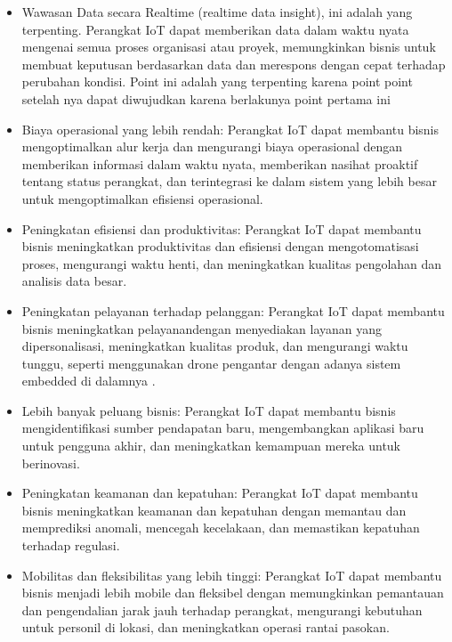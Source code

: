 \documentclass{article}
\begin{document}
\begin{itemize}
    \item Wawasan Data secara Realtime (realtime data insight), ini adalah yang terpenting. Perangkat IoT dapat memberikan data dalam waktu nyata mengenai semua proses organisasi atau proyek, memungkinkan bisnis untuk membuat keputusan berdasarkan data dan merespons dengan cepat terhadap perubahan kondisi. Point ini adalah yang terpenting karena point point setelah nya dapat diwujudkan karena berlakunya point pertama ini
    \item  Biaya operasional yang lebih rendah: Perangkat IoT dapat membantu bisnis mengoptimalkan alur kerja dan mengurangi biaya operasional dengan memberikan informasi dalam waktu nyata, memberikan nasihat proaktif tentang status perangkat, dan terintegrasi ke dalam sistem yang lebih besar untuk mengoptimalkan efisiensi operasional.
    \item Peningkatan efisiensi dan produktivitas: Perangkat IoT dapat membantu bisnis meningkatkan produktivitas dan efisiensi dengan mengotomatisasi proses, mengurangi waktu henti, dan meningkatkan kualitas pengolahan dan analisis data besar.
    \item Peningkatan pelayanan terhadap pelanggan: Perangkat IoT dapat membantu bisnis meningkatkan pelayanandengan menyediakan layanan yang dipersonalisasi, meningkatkan kualitas produk, dan mengurangi waktu tunggu, seperti menggunakan drone pengantar dengan adanya sistem embedded di dalamnya .
    \item Lebih banyak peluang bisnis: Perangkat IoT dapat membantu bisnis mengidentifikasi sumber pendapatan baru, mengembangkan aplikasi baru untuk pengguna akhir, dan meningkatkan kemampuan mereka untuk berinovasi.
    \item Peningkatan keamanan dan kepatuhan: Perangkat IoT dapat membantu bisnis meningkatkan keamanan dan kepatuhan dengan memantau dan memprediksi anomali, mencegah kecelakaan, dan memastikan kepatuhan terhadap regulasi.
    \item  Mobilitas dan fleksibilitas yang lebih tinggi: Perangkat IoT dapat membantu bisnis menjadi lebih mobile dan fleksibel dengan memungkinkan pemantauan dan pengendalian jarak jauh terhadap perangkat, mengurangi kebutuhan untuk personil di lokasi, dan meningkatkan operasi rantai pasokan.
\end{itemize}
\end{document}
